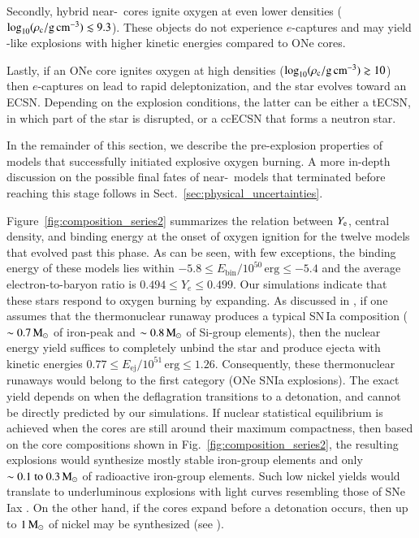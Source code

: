 \documentclass[main.tex]{subfiles}
\begin{document}
Secondly, hybrid near-\mch\  cores ignite oxygen at even lower densities ($\log_{10} (\rho_{\mathrm{c}}/ \mathrm{g\,cm^{-3}}) \lesssim 9.3$). These objects do not experience $e$-captures and may yield \ia-like explosions with higher kinetic energies compared to ONe cores. 

Lastly, if an ONe core ignites oxygen at high densities ($\log_{10} (\rho_{\mathrm{c}}/ \mathrm{g\,cm^{-3}}) \gtrsim 10$) then $e$-captures on  lead to rapid deleptonization, and the star  evolves toward an ECSN. Depending on the explosion conditions, the latter can be either a tECSN, in which part of the star is disrupted, or a ccECSN that forms a neutron star. 
    

In the remainder of this section, we describe the pre-explosion properties of models that successfully initiated explosive oxygen burning. A more in-depth discussion on the possible final fates of near-\mch\ models that terminated before reaching this stage follows in Sect.~\ref{sec:physical_uncertainties}. 

Figure~\ref{fig:composition_series2} summarizes  the relation between $Y_{\rm e}$, central density, and binding energy at the onset of oxygen ignition for the twelve models that evolved past this phase. 
As can be seen, with few exceptions, the binding energy of these models lies within $-5.8 \leq E_{\text{bin}} / 10^{50}\,\text{erg} \leq -5.4$ and the average electron-to-baryon ratio is $0.494 \leq Y_e \leq 0.499$. 
Our simulations indicate that these stars respond to  oxygen burning by expanding. As discussed in , if one assumes that the thermonuclear runaway produces a typical SN\,Ia 
composition  ($\sim 0.7\mathrm{\,M_\odot}$ of iron-peak and $\sim 0.8\mathrm{\,M_\odot}$ of Si-group elements), 
then the nuclear energy yield suffices to completely unbind the star and produce ejecta with kinetic energies  
$0.77 \leq E_{\text{ej}} / 10^{51}\,\text{erg} \leq 1.26$. 
Consequently, these thermonuclear runaways would belong to the first category (ONe SNIa explosions). 
The exact  yield depends on  when the deflagration transitions to a detonation, 
and cannot be directly predicted by our simulations.  
If nuclear statistical equilibrium is achieved when the cores are still around their maximum compactness, 
then based on the core compositions shown in Fig.~\ref{fig:composition_series2}, the resulting explosions would synthesize mostly stable iron-group 
elements and only $\sim \numrange{0.1}{0.3}\msun$ of radioactive iron-group elements. 
Such low nickel yields would translate to underluminous explosions with light curves resembling those of  
SNe\,Iax \citep[e.g.,][]{2017hsnJ}. 
On the other hand, if the cores expand before a detonation occurs, 
then up to $1\mathrm{\,M_\odot}$ of nickel may be synthesized (see ).
\end{document}
